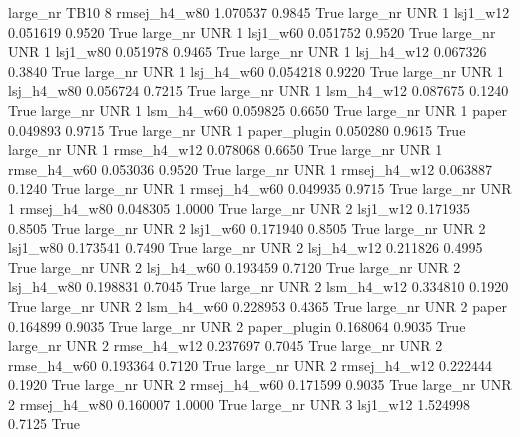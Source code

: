   large_nr     TB10                 8 rmsej_h4_w80    1.070537      0.9845    True
  large_nr      UNR                 1     lsj1_w12    0.051619      0.9520    True
  large_nr      UNR                 1     lsj1_w60    0.051752      0.9520    True
  large_nr      UNR                 1     lsj1_w80    0.051978      0.9465    True
  large_nr      UNR                 1   lsj_h4_w12    0.067326      0.3840    True
  large_nr      UNR                 1   lsj_h4_w60    0.054218      0.9220    True
  large_nr      UNR                 1   lsj_h4_w80    0.056724      0.7215    True
  large_nr      UNR                 1   lsm_h4_w12    0.087675      0.1240    True
  large_nr      UNR                 1   lsm_h4_w60    0.059825      0.6650    True
  large_nr      UNR                 1        paper    0.049893      0.9715    True
  large_nr      UNR                 1 paper_plugin    0.050280      0.9615    True
  large_nr      UNR                 1  rmse_h4_w12    0.078068      0.6650    True
  large_nr      UNR                 1  rmse_h4_w60    0.053036      0.9520    True
  large_nr      UNR                 1 rmsej_h4_w12    0.063887      0.1240    True
  large_nr      UNR                 1 rmsej_h4_w60    0.049935      0.9715    True
  large_nr      UNR                 1 rmsej_h4_w80    0.048305      1.0000    True
  large_nr      UNR                 2     lsj1_w12    0.171935      0.8505    True
  large_nr      UNR                 2     lsj1_w60    0.171940      0.8505    True
  large_nr      UNR                 2     lsj1_w80    0.173541      0.7490    True
  large_nr      UNR                 2   lsj_h4_w12    0.211826      0.4995    True
  large_nr      UNR                 2   lsj_h4_w60    0.193459      0.7120    True
  large_nr      UNR                 2   lsj_h4_w80    0.198831      0.7045    True
  large_nr      UNR                 2   lsm_h4_w12    0.334810      0.1920    True
  large_nr      UNR                 2   lsm_h4_w60    0.228953      0.4365    True
  large_nr      UNR                 2        paper    0.164899      0.9035    True
  large_nr      UNR                 2 paper_plugin    0.168064      0.9035    True
  large_nr      UNR                 2  rmse_h4_w12    0.237697      0.7045    True
  large_nr      UNR                 2  rmse_h4_w60    0.193364      0.7120    True
  large_nr      UNR                 2 rmsej_h4_w12    0.222444      0.1920    True
  large_nr      UNR                 2 rmsej_h4_w60    0.171599      0.9035    True
  large_nr      UNR                 2 rmsej_h4_w80    0.160007      1.0000    True
  large_nr      UNR                 3     lsj1_w12    1.524998      0.7125    True
